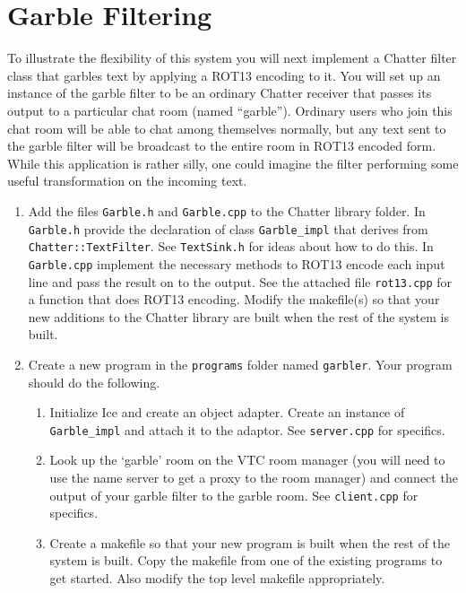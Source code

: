 \documentclass[twocolumn]{article}
\begin{document}
\section{Garble Filtering}

To illustrate the flexibility of this system you will next implement a Chatter filter class that
garbles text by applying a ROT13 encoding to it. You will set up an instance of the garble
filter to be an ordinary Chatter receiver that passes its output to a particular chat room
(named ``garble''). Ordinary users who join this chat room will be able to chat among themselves
normally, but any text sent to the garble filter will be broadcast to the entire room in ROT13
encoded form. While this application is rather silly, one could imagine the filter performing
some useful transformation on the incoming text.

\begin{enumerate}

\item Add the files \texttt{Garble.h} and \texttt{Garble.cpp} to the Chatter library folder. In
  \texttt{Garble.h} provide the declaration of class \texttt{Garble\_impl} that derives from
  \texttt{Chatter::TextFilter}. See \texttt{TextSink.h} for ideas about how to do this. In
  \texttt{Garble.cpp} implement the necessary methods to ROT13 encode each input line and pass
  the result on to the output. See the attached file \texttt{rot13.cpp} for a function that does
  ROT13 encoding. Modify the makefile(s) so that your new additions to the Chatter library are
  built when the rest of the system is built.

\item Create a new program in the \texttt{programs} folder named \texttt{garbler}. Your program
  should do the following.

\begin{enumerate}

\item Initialize Ice and create an object adapter. Create an instance of \texttt{Garble\_impl}
  and attach it to the adaptor. See \texttt{server.cpp} for specifics.

\item Look up the `garble' room on the VTC room manager (you will need to use the name server to
  get a proxy to the room manager) and connect the output of your garble filter to the garble
  room. See \texttt{client.cpp} for specifics.

\item Create a makefile so that your new program is built when the rest of the system is built.
  Copy the makefile from one of the existing programs to get started. Also modify the top level
  makefile appropriately.
\end{enumerate}

\end{enumerate}
\end{document}
